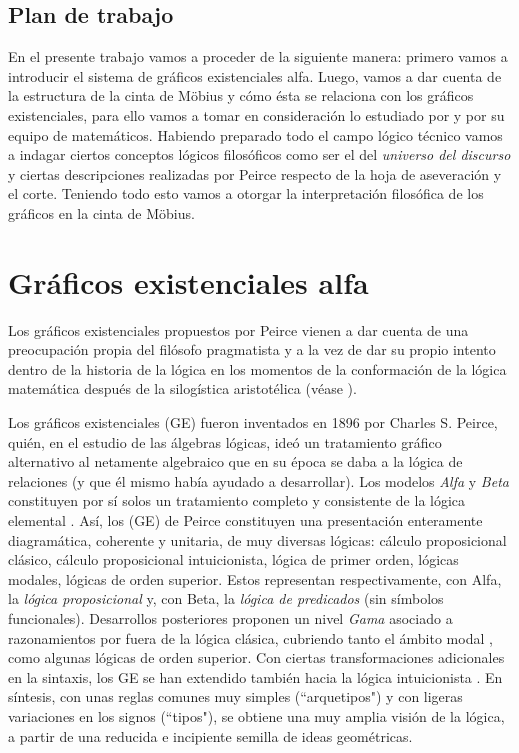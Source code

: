 \documentclass[
	fontsize=10pt, %
	twoside=true, %
	secnumdepth=1, %
	abstract=true, %
]{kaohandt}
\begin{document}
\subsection{Plan de trabajo} %
\label{sub:Plan de trabajo}
En el presente trabajo vamos a proceder de la siguiente manera: primero vamos a introducir el sistema de gráficos existenciales alfa. Luego, vamos a dar cuenta de la estructura de la cinta de Möbius y cómo ésta se relaciona con los gráficos existenciales, para ello vamos a tomar en consideración lo estudiado por \cite{oostra2023} y por su equipo de matemáticos. Habiendo preparado todo el campo lógico técnico vamos a indagar ciertos conceptos lógicos filosóficos como ser el del \textit{universo del discurso} y ciertas descripciones realizadas por Peirce respecto de la hoja de aseveración y el corte. Teniendo todo esto vamos a otorgar la interpretación filosófica de los gráficos en la cinta de Möbius.



\section{Gráficos existenciales alfa}

Los gráficos existenciales propuestos por Peirce vienen a dar cuenta de una preocupación propia del filósofo pragmatista y a la vez de dar su propio intento dentro de la historia de la lógica en los momentos de la conformación de la lógica matemática después de la silogística aristotélica (véase ).

Los gráficos existenciales (GE) fueron inventados en 1896 por Charles S. Peirce, quién, en el estudio de las álgebras lógicas, ideó un tratamiento gráfico alternativo al netamente algebraico que en su época se daba a la lógica de relaciones (y que él mismo había ayudado a desarrollar). Los modelos \textit{Alfa} y \textit{Beta} constituyen por sí solos un tratamiento completo y consistente de la lógica elemental . Así, los (GE) de Peirce constituyen una presentación enteramente diagramática, coherente y unitaria, de muy diversas lógicas: cálculo proposicional clásico, cálculo proposicional intuicionista, lógica de primer orden, lógicas modales, lógicas de orden superior. Estos representan respectivamente, con Alfa, la \textit{lógica proposicional} y, con Beta, la \textit{lógica de predicados} (sin símbolos funcionales). Desarrollos posteriores proponen un nivel \textit{Gama} asociado a razonamientos por fuera de la lógica clásica, cubriendo tanto el ámbito modal , como algunas lógicas de orden superior. Con ciertas transformaciones adicionales en la sintaxis, los GE se han extendido también hacia la lógica intuicionista . En síntesis, con unas reglas comunes muy simples (``arquetipos") y con ligeras variaciones en los signos (``tipos"), se obtiene una muy amplia visión de la lógica, a partir de una reducida e incipiente semilla de ideas geométricas.
\end{document}
